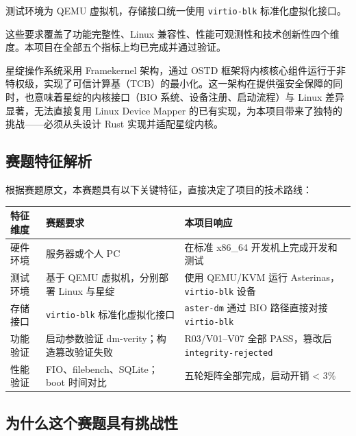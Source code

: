 测试环境为 QEMU 虚拟机，存储接口统一使用 \texttt{virtio-blk} 标准化虚拟化接口。

这些要求覆盖了功能完整性、Linux 兼容性、性能可观测性和技术创新性四个维度。本项目在全部五个指标上均已完成并通过验证。

星绽操作系统采用 Framekernel 架构，通过 OSTD 框架将内核核心组件运行于非特权级，实现了可信计算基（TCB）的最小化。这一架构在提供强安全保障的同时，也意味着星绽的内核接口（BIO 系统、设备注册、启动流程）与 Linux 差异显著，无法直接复用 Linux Device Mapper 的已有实现，为本项目带来了独特的挑战——必须从头设计 Rust 实现并适配星绽内核。

\subsection{赛题特征解析}

根据赛题原文，本赛题具有以下关键特征，直接决定了项目的技术路线：

\begin{table}[H]
    \centering
    \begin{tabular}{p{}p{}p{}}
        \toprule
        \textbf{特征维度} & \textbf{赛题要求} & \textbf{本项目响应} \\
        \midrule
        硬件环境 & 服务器或个人 PC & 在标准 x86\_64 开发机上完成开发和测试 \\
        测试环境 & 基于 QEMU 虚拟机，分别部署 Linux 与星绽 & 使用 QEMU/KVM 运行 Asterinas，\texttt{virtio-blk} 设备 \\
        存储接口 & \texttt{virtio-blk} 标准化虚拟化接口 & \texttt{aster-dm} 通过 BIO 路径直接对接 \texttt{virtio-blk} \\
        功能验证 & 启动参数验证 dm-verity；构造篡改验证失败 & R03/V01--V07 全部 PASS，篡改后 \texttt{integrity-rejected} \\
        性能验证 & FIO、filebench、SQLite；boot 时间对比 & 五轮矩阵全部完成，启动开销 < 3\% \\
        \bottomrule
    \end{tabular}
\end{table}

\subsection{为什么这个赛题具有挑战性}

